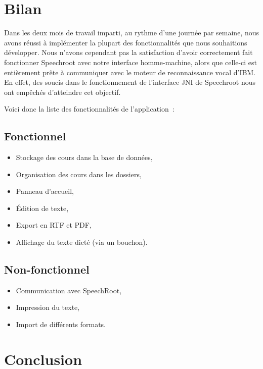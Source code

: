 \documentclass[a4paper,11pt]{report}
\begin{document}








\chapter{Bilan}

Dans les deux mois de travail imparti, au rythme d'une journée par semaine, nous avons réussi à implémenter la plupart des fonctionnalités que nous souhaitions développer. 
Nous n'avons cependant pas la satisfaction d'avoir correctement fait fonctionner Speechroot avec notre interface homme-machine, alors que celle-ci est entièrement prête à communiquer avec le moteur de reconnaissance vocal d'IBM.
En effet, des soucis dans le fonctionnement de l'interface JNI de Speechroot nous ont empêchés d'atteindre cet objectif.

Voici donc la liste des fonctionnalités de l'application~:

\section{Fonctionnel}
\begin{itemize}
	\item Stockage des cours dans la base de données,
	\item Organisation des cours dans les dossiers,
	\item Panneau d'accueil,
	\item Édition de texte,
	\item Export en RTF et PDF,
	\item Affichage du texte dicté (via un bouchon).
\end{itemize}

\section{Non-fonctionnel}
\begin{itemize}
	\item Communication avec SpeechRoot,
	\item Impression du texte,
	\item Import de différents formats.	
\end{itemize}


\chapter{Conclusion}
\end{document}
